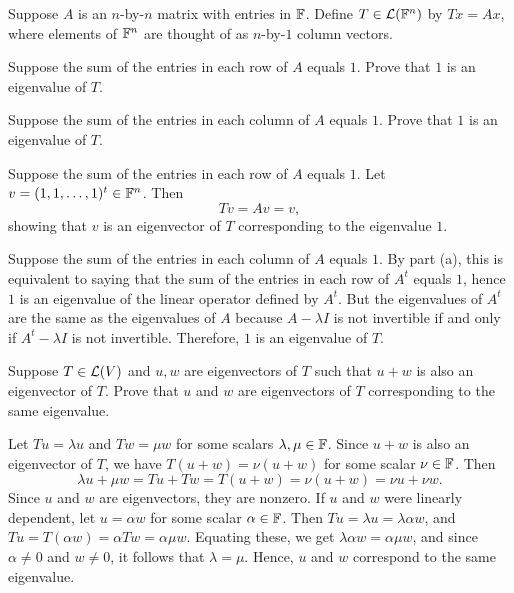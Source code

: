 \begin{exc}
\begin{exercise}
Suppose $A$ is an $n$-by-$n$ matrix with entries in $\mathbb{F}$. Define
$T\in\mathcal{L}(\mathbb{F}^n)$ by $Tx=Ax$, where elements of $\mathbb{F}^n$ are thought of as
$n$-by-$1$ column vectors.
\begin{parts}
\item Suppose the sum of the entries in each row of $A$ equals $1$. Prove that
  $1$ is an eigenvalue of $T$.
\item Suppose the sum of the entries in each column of $A$ equals $1$. Prove
  that $1$ is an eigenvalue of $T$.
\end{parts}
\end{exercise}
\begin{solution}
\begin{parts}
\item Suppose the sum of the entries in each row of $A$ equals $1$. Let
  $v=(1,1,\dots,1)^t\in\mathbb{F}^n$. Then
  \[ Tv = Av = v, \]
  showing that $v$ is an eigenvector of $T$ corresponding to the eigenvalue
  $1$.
\item Suppose the sum of the entries in each column of $A$ equals $1$. By part
  (a), this is equivalent to saying that the sum of the entries in each row of
  $A^t$ equals $1$, hence $1$ is an eigenvalue of the linear operator defined
  by $A^t$. But the eigenvalues of $A^t$ are the same as the eigenvalues of $A$
  because $A-\lambda I$ is not invertible if and only if $A^t-\lambda I$ is not
  invertible. Therefore, $1$ is an eigenvalue of $T$. \qedhere
\end{parts}
\end{solution}

\begin{exercise}
Suppose $T\in\mathcal{L}(V)$ and $u,w$ are eigenvectors of $T$ such that $u+w$ is
also an eigenvector of $T$. Prove that $u$ and $w$ are eigenvectors of $T$
corresponding to the same eigenvalue.
\end{exercise}
\begin{solution}
Let $Tu=\lambda u$ and $Tw=\mu w$ for some scalars $\lambda,\mu\in\mathbb{F}$. Since
$u+w$ is also an eigenvector of $T$, we have $T(u+w)=\nu(u+w)$ for some scalar
$\nu\in\mathbb{F}$. Then
\[ \lambda u+\mu w = Tu+Tw = T(u+w) = \nu(u+w) = \nu u+\nu w. \]
Since $u$ and $w$ are eigenvectors, they are nonzero. If $u$ and $w$ were
linearly dependent, let $u=\alpha w$ for some scalar $\alpha\in\mathbb{F}$. Then
$Tu=\lambda u=\lambda\alpha w$, and $Tu=T(\alpha w)=\alpha Tw=\alpha\mu w$.
Equating these, we get $\lambda\alpha w=\alpha\mu w$, and since $\alpha\ne0$
and $w\ne0$, it follows that $\lambda=\mu$. Hence, $u$ and $w$ correspond to
the same eigenvalue.


\end{solution}
\end{exc}

